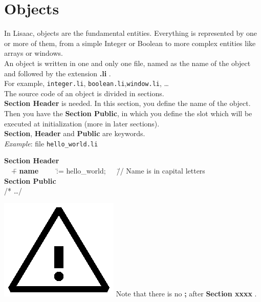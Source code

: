 \documentclass[11pt]{mybook}
\newcommand{\warning}{\includegraphics[scale=0.3]{figures/warning}}
\newcommand{\en}[1]
{
  \if \englishversion 1
  #1
  \fi
}
\begin{document}
\section{Objects}
\label{quickstart:objects}
%
\en{
In Lisaac, objects are the fundamental entities. Everything is represented by one or more of them, 
from a simple Integer or Boolean to more complex entities like arrays or windows.\\
An object is written in one and only one file, named as the name of the object and followed by the extension {\bf{} .li} .\\
For example, {\tt{}integer.li}, {\tt{}boolean.li},{\tt{}window.li}, \ldots\\

The source code of an object is divided in sections.\\
{\bf{}Section Header} is needed. In this section, you define the name of the object. 
Then you have the {\bf{}Section Public}, in which you define the slot which will be 
executed at initialization (more in later sections).\\

{\bf{}Section},  {\bf{}Header} and  {\bf{}Public} are keywords.\\

{\it{}Example}: file {\tt{}hello\_world.li}
{\tt\begin{tabbing}
{\bf{}Section Header}\\
~~\=+ {\bf{}name}~~~~~\=:= {\sc{}hello\_world};~~~\=// Name is in capital letters \\
{\bf{}Section Public}\\
  \>/* \ldots */\\
\end{tabbing}}

\warning{} Note that there is no {\bf{} ;} after {\bf{}Section xxxx} .
}
\end{document}
